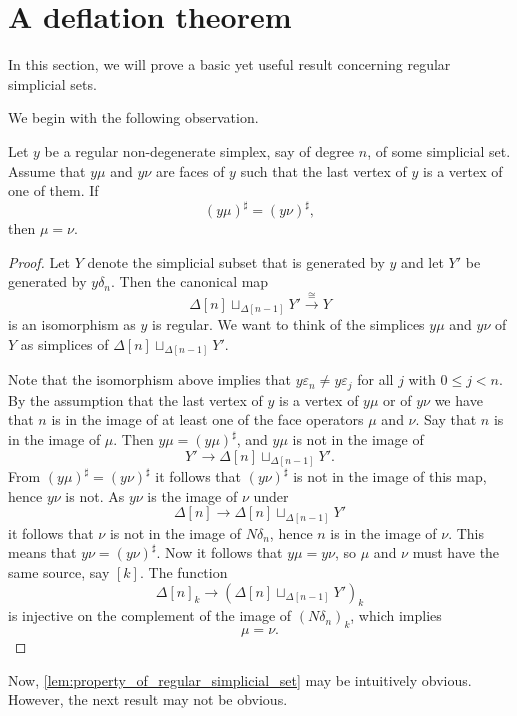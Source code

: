 
\section{A deflation theorem}
\label{sec:deflation_thm}

In this section, we will prove a basic yet useful result concerning regular simplicial sets.

We begin with the following observation.
\begin{lemma}\label{lem:property_of_regular_simplicial_set}
Let $y$ be a regular non-degenerate simplex, say of degree $n$, of some simplicial set. Assume that $y\mu$ and $y\nu$ are faces of $y$ such that the last vertex of $y$ is a vertex of one of them. If
\[(y\mu )^\sharp = (y\nu )^\sharp ,\]
then $\mu =\nu$.
\end{lemma}
\begin{proof}
Let $Y$ denote the simplicial subset that is generated by $y$ and let $Y'$ be generated by $y\delta _{n}$. Then the canonical map
\[\Delta [n]\sqcup _{\Delta [n-1]}Y'\xrightarrow{\cong } Y\]
is an isomorphism as $y$ is regular. We want to think of the simplices $y\mu$ and $y\nu$ of $Y$ as simplices of $\Delta [n]\sqcup _{\Delta [n-1]}Y'$.

Note that the isomorphism above implies that $y\varepsilon _n\neq y\varepsilon _j$ for all $j$ with $0\leq j<n$. By the assumption that the last vertex of $y$ is a vertex of $y\mu$ or of $y\nu$ we have that $n$ is in the image of at least one of the face operators $\mu$ and $\nu$. Say that $n$ is in the image of $\mu$. Then $y\mu =(y\mu )^\sharp$, and $y\mu$ is not in the image of
\[Y'\to \Delta [n]\sqcup _{\Delta [n-1]}Y'.\]
From $(y\mu )^\sharp =(y\nu )^\sharp$ it follows that $(y\nu )^\sharp$ is not in the image of this map, hence $y\nu$ is not. As $y\nu$ is the image of $\nu$ under
\[\Delta [n]\to \Delta [n]\sqcup _{\Delta [n-1]}Y'\]
it follows that $\nu$ is not in the image of $N\delta _n$, hence $n$ is in the image of $\nu$. This means that $y\nu =(y\nu )^\sharp$. Now it follows that $y\mu =y\nu$, so $\mu$ and $\nu$ must have the same source, say $[k]$. The function
\[\Delta [n]_k\to (\Delta [n]\sqcup _{\Delta [n-1]}Y')_k\]
is injective on the complement of the image of $(N\delta _n)_k$, which implies
\[\mu =\nu .\]
\end{proof}
\noindent Now, \cref{lem:property_of_regular_simplicial_set} may be intuitively obvious. However, the next result may not be obvious.

